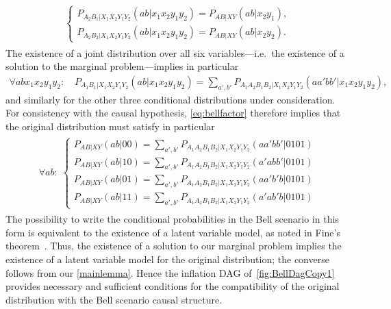 {\begin{align}
\begin{split}
\begin{cases}
	P_{A_2 B_1 | X_1 X_2 Y_1 Y_2}(a b | x_1 x_2 y_1 y_2)  = P_{A B | X Y}(a b | x_2 y_1), \\
	P_{A_2 B_2 | X_1 X_2 Y_1 Y_2}(a b | x_1 x_2 y_1 y_2)  = P_{A B | X Y}(a b | x_2 y_2).
\end{cases}\end{split}\end{align}
The existence of a joint distribution over all six variables---i.e.~the existence of a solution to the marginal problem---implies in particular
\begin{align}
	\forall{a b x_1 x_2 y_1 y_2}: \quad P_{A_1 B_1 | X_1 X_2 Y_1 Y_2}(a b | x_1 x_2 y_1 y_2)  =  \sum\nolimits_{a',b'} P_{A_1 A_2 B_1 B_2 | X_1 X_2 Y_1 Y_2}(a a' b b'|x_1 x_2 y_1 y_2),
\end{align}
and similarly for the other three conditional distributions under consideration. For consistency with the causal hypothesis, \cref{eq:bellfactor} therefore implies that the original distribution must satisfy in particular
\begin{align}\begin{split}\label{eq:finalBellstep}\forall{a b}:\; \begin{cases}
	P_{A B | X Y}(a b | 0 0)  =  \sum\nolimits_{a',b'} P_{A_1 A_2 B_1 B_2| X_1 X_2 Y_1 Y_2}(a a' b b'|0101) \\
	P_{A B | X Y}(a b | 1 0)  =  \sum\nolimits_{a',b'} P_{A_1 A_2 B_1 B_2| X_1 X_2 Y_1 Y_2}(a' a b b'|0101) \\
	P_{A B | X Y}(a b | 0 1)  =  \sum\nolimits_{a',b'} P_{A_1 A_2 B_1 B_2| X_1 X_2 Y_1 Y_2}(a a' b' b|0101) \\
	P_{A B | X Y}(a b | 1 1)  =  \sum\nolimits_{a',b'} P_{A_1 A_2 B_1 B_2| X_1 X_2 Y_1 Y_2}(a' a b' b|0101)
\end{cases}\end{split}\end{align}
The possibility to write the conditional probabilities in the Bell scenario in this form is equivalent to the existence of a latent variable model, as noted in Fine's theorem~\cite{FineTheorem}. Thus, the existence of a solution to our marginal problem implies the existence of a latent variable model for the original distribution; the converse follows from our \cref{mainlemma}. Hence the inflation DAG of~\cref{fig:BellDagCopy1} provides necessary and sufficient conditions for the compatibility of the original distribution with the Bell scenario causal structure.

}

